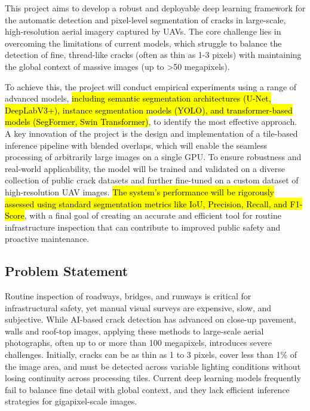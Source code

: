 \hs This project aims to develop a robust and deployable deep learning framework for the automatic detection and pixel-level segmentation of cracks in large-scale, high-resolution aerial imagery captured by UAVs. The core challenge lies in overcoming the limitations of current models, which struggle to balance the detection of fine, thread-like cracks (often as thin as 1-3 pixels) with maintaining the global context of massive images (up to >50 megapixels).

To achieve this, the project will conduct empirical experiments using a range of advanced models, \hl{including semantic segmentation architectures (U-Net, DeepLabV3+), instance segmentation models (YOLO), and transformer-based models (SegFormer, Swin Transformer)}, to identify the most effective approach. A key innovation of the project is the design and implementation of a tile-based inference pipeline with blended overlaps, which will enable the seamless processing of arbitrarily large images on a single GPU. To ensure robustness and real-world applicability, the model will be trained and validated on a diverse collection of public crack datasets and further fine-tuned on a custom dataset of high-resolution UAV images. \hl{The system's performance will be rigorously assessed using standard segmentation metrics like IoU, Precision, Recall, and F1-Score}, with a final goal of creating an accurate and efficient tool for routine infrastructure inspection that can contribute to improved public safety and proactive maintenance.

\subsection{Problem Statement}

\hs Routine inspection of roadways, bridges, and runways is critical for infrastructural safety, yet manual visual surveys are expensive, slow, and subjective. While AI-based crack detection has advanced on close-up pavement, walls and roof-top images, applying these methods to large-scale aerial photographs, often up to or more than 100 megapixels, introduces severe challenges. Initially, cracks can be as thin as 1 to 3 pixels, cover less than 1\% of the image area, and must be detected across variable lighting conditions without losing continuity across processing tiles. Current deep learning models frequently fail to balance fine detail with global context, and they lack efficient inference strategies for gigapixel-scale images.

